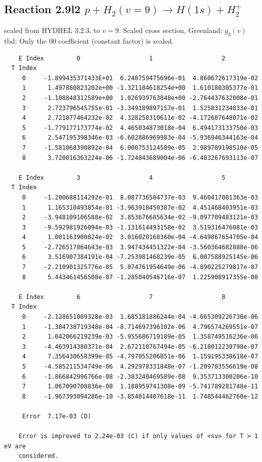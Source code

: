 \documentclass[12pt,dvipdfmx]{article}
\begin{document}
\subsection{
Reaction 2.9l2 $   p + H_2(v=9) \rightarrow H(1s) + H_2^+$}
scaled from HYDHEL 3.2.3, to $v=9$. Scaled cross section, Greenland: $g_2(v)$
tbd:
Only the 00 coefficient (constant factor) is scaled.


\begin{small}\begin{verbatim}
    E Index         0                   1                   2
  T Index
     0     -1.899435371433E+01  6.248759475696e-01  4.860672617319e-02
     1      1.497880823202e+00 -1.321184618254e+00  1.610180305377e-01
     2     -1.108848312589e+00  1.026939763848e+00 -2.764437632008e-01
     3      2.723796545755e-01 -3.349189897157e-01  1.525831234833e-01
     4      2.721877464232e-02  4.328258310611e-02 -4.172607648071e-02
     5     -1.779177173774e-02  4.465034873018e-04  6.494173133750e-03
     6      2.547195398346e-03 -6.602886969983e-04 -5.936946344163e-04
     7     -1.581068390892e-04  6.000753124589e-05  2.989789198510e-05
     8      3.720016363224e-06 -1.724843689004e-06 -6.403267693113e-07

    E Index         3                   4                   5
  T Index
     0     -1.200688114292e-01  8.087736504737e-03  9.460417081363e-03
     1      1.165310493854e-01 -3.963918450387e-02  4.451468403951e-03
     2     -3.948109106588e-02  3.853676685634e-02 -9.097709483121e-03
     3     -9.592981926094e-03 -1.131614493158e-02  3.519316476081e-03
     4      1.001163900824e-02  3.016020168360e-04 -4.649867654705e-04
     5     -2.726517864643e-03  3.947434451322e-04 -3.560364682888e-06
     6      3.516907384191e-04 -7.253981468239e-05  6.007588925145e-06
     7     -2.210901325776e-05  5.074761954649e-06 -4.890225279817e-07
     8      5.443461456508e-07 -1.285040546716e-07  1.225908917355e-08

    E Index         6                   7                   8
  T Index
     0     -2.128651089328e-03  1.685181886244e-04 -4.665309226730e-06
     1     -1.304738719348e-04 -8.714697396102e-06  4.796574269551e-07
     2      1.042066219239e-03 -5.955686719189e-05  1.358749516236e-06
     3     -4.463914380371e-04  2.672110767494e-05 -6.218012239798e-07
     4      7.356430658399e-05 -4.797055206851e-06  1.159195338618e-07
     5     -4.585211534749e-06  4.292978331848e-07 -1.209703556619e-08
     6     -1.866842996766e-08 -2.383240469589e-08  9.353713300206e-10
     7      1.067090708836e-08  1.188959741308e-09 -5.741789281748e-11
     8     -1.967393094286e-10 -3.854014407618e-11  1.748544462760e-12

     Error  7.17e-03 (D)

    Error is improved to 2.24e-03 (C) if only values of <sv> for T > 1 eV are
    considered.
\end{verbatim}\end{small}
\newpage
\end{document}
